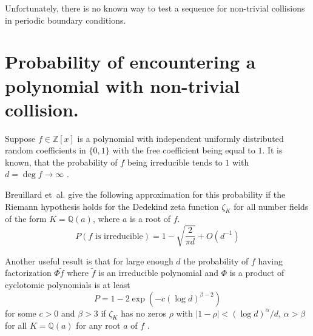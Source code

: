 \documentclass[12pt, a4paper]{article}
\begin{document}
Unfortunately, there is no known way to test a sequence for non-trivial
collisions in periodic boundary conditions.

\section{Probability of encountering a polynomial with non-trivial collision.}

Suppose $f \in \mathbb{Z}[x]$ is a polynomial with independent uniformly
distributed random coefficients in $\{0, 1\}$ with the free coefficient being
equal to $1$. It is known, that the probability of $f$ being irreducible tends
to $1$ with $d = \deg f \to \infty$ \cite{konyagin1999number}.

Breuillard et~al. \cite[Corollary~4]{breuillard2019irreducibility} give the
following approximation for this probability if the Riemann hypothesis holds for
the Dedekind zeta function $\zeta_K$ for all number fields of the form
$K = \mathbb{Q}(a)$, where $a$ is a root of $f$.
\begin{equation}
  P(\text{$f$ is irreducible}) = 1 - \sqrt{\frac{2}{\pi d}} + O(d^{-1})
  \label{eq:prob-irr}
\end{equation}

Another useful result is that for large enough $d$ the probability
of $f$ having factorization $\Phi \tilde{f}$ where $\tilde{f}$ is an irreducible
polynomial and $\Phi$ is a product of cyclotomic polynomials is at least
\begin{equation}
  P = 1 - 2\exp(-c(\log d)^{\beta - 2})
  \label{eq:prob-cyc-1}
\end{equation}
for some $c > 0$ and $\beta > 3$ if $\zeta_K$ has no zeros $\rho$ with
$|1 - \rho| < (\log d)^\alpha/d$, $\alpha > \beta$ for all $K = \mathbb{Q}(a)$
for any root $a$ of $f$ \cite[Theorem~5]{breuillard2019irreducibility}.
\end{document}
